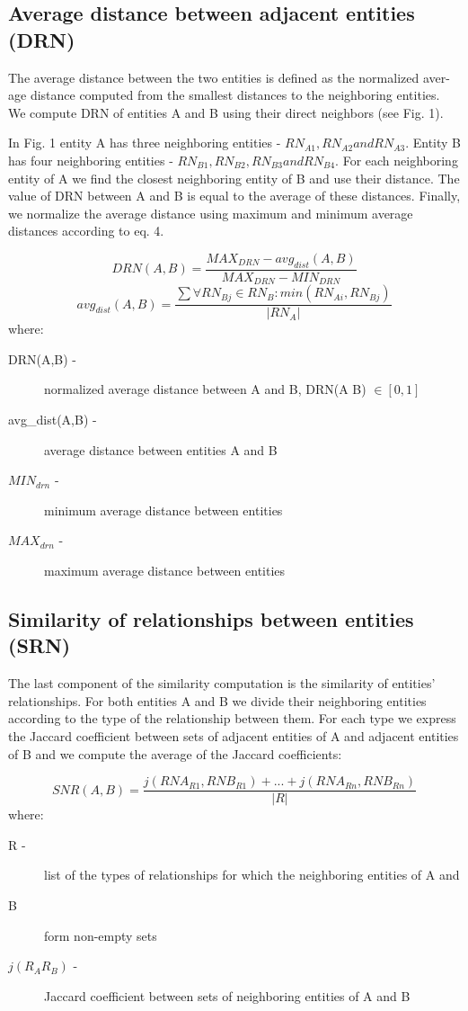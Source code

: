 \documentclass{llncs}
\begin{document}
\subsection{Average distance between adjacent entities (DRN)}
The average distance between the two entities is defined as the normalized aver-
age distance computed from the smallest distances to the neighboring entities.
We compute DRN of entities A and B using their direct neighbors (see Fig. 1).

In Fig. 1 entity A has three neighboring entities - $RN_{A1}, RN_{A2} and RN_{A3}$.
Entity B has four neighboring entities - $RN_{B1}, RN_{B2}, RN_{B3} and RN_{B4}$. For
each neighboring entity of A we find the closest neighboring entity of B and use
their distance. The value of DRN between A and B is equal to the average of
these distances. Finally, we normalize the average distance using maximum and
minimum average distances according to eq. 4.

$$ DRN(A,B) = \frac{MAX_{DRN} - avg_{dist}(A,B)}{MAX_{DRN} - MIN_{DRN}} $$
$$ avg_{dist}(A,B) = \frac{\sum \forall RN_{Bj} \in RN_B : min(RN_{Ai}, RN_{Bj})}{|RN_A|} $$
where:

\begin{description}
\item[DRN(A,B) - ]normalized average distance between A and B, DRN(A B) $\in[0,1]$
\item[{avg\_dist}(A,B) - ]average distance between entities A and B
\item[$ MIN_{drn} $ - ]minimum average distance between entities
\item[$ MAX_{drn} $ - ]maximum average distance between entities
\end{description}


\subsection{Similarity of relationships between entities (SRN)}
The last component of the similarity computation is the similarity of entities'
relationships. For both entities A and B we divide their neighboring entities
according to the type of the relationship between them. For each type we express
the Jaccard coefficient between sets of adjacent entities of A and adjacent entities
of B and we compute the average of the Jaccard coefficients:

$$ SNR(A,B) = \frac{j(RNA_{R1},RNB_{R1}) + ... + j(RNA_{Rn},RNB_{Rn})}{|R|} $$
where:

\begin{description}
\item[\textsc{R} - ]list of the types of relationships for which the neighboring entities of A and
\item[\textsc{B}]form non-empty sets
\item[$ j(R_A R_B) $ - ] Jaccard coefficient between sets of neighboring entities of A and B
\end{description}
\end{document}
